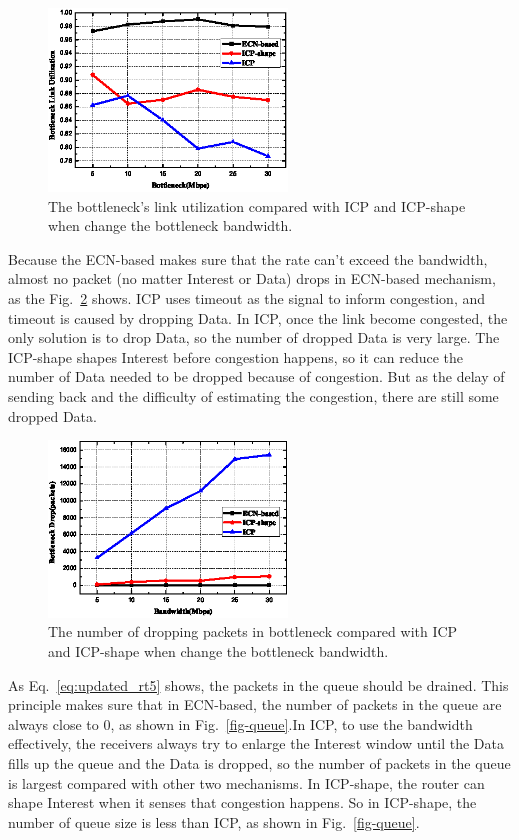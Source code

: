 \begin{figure}[t]
	\centering
	\includegraphics[width=2.5in]{utilization-pic-cut.eps}
	\caption{The bottleneck's link utilization compared with ICP and ICP-shape when change the bottleneck bandwidth.}
	\label{fig-linkuti}
\end{figure}

Because the ECN-based makes sure that the rate can't exceed the bandwidth, almost no packet (no matter Interest or Data) drops in ECN-based mechanism, as the Fig.~\ref{fig-drop} shows. ICP uses timeout as the signal to inform congestion, and timeout is caused by dropping Data. In ICP, once the link become congested, the only solution is to drop Data, so the number of dropped Data is very large. The ICP-shape shapes Interest before congestion happens, so it can reduce the number of Data needed to be dropped because of congestion. But as the delay of sending back and the difficulty of estimating the congestion, there are still some dropped Data.

\begin{figure}[t]
	\centering
	\includegraphics[width=2.5in]{drop-pic-cut.eps}
	\caption{The number of dropping packets in bottleneck compared with ICP and ICP-shape when change the bottleneck bandwidth.}
	\label{fig-drop}
\end{figure}

As Eq.~\ref{eq:updated_rt5} shows, the packets in the queue should be drained. This principle makes sure that in ECN-based, the number of packets in the queue are always close to 0, as shown in Fig.~\ref{fig-queue}.In ICP, to use the bandwidth effectively, the receivers always try to enlarge the Interest window until the Data fills up the queue and the Data is dropped, so the number of packets in the queue is largest compared with other two mechanisms. In ICP-shape, the router can shape Interest when it senses that congestion happens. So in ICP-shape, the number of queue size is less than ICP, as shown in Fig.~\ref{fig-queue}.

